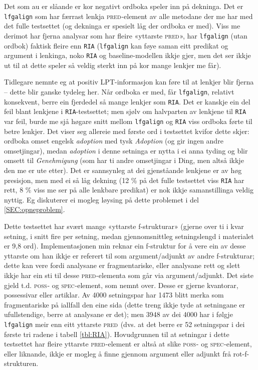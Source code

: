 \documentclass[12pt,a4paper,oneside,draft]{report}
\newcommand{\F}[2]{\textsc{#1}\ensuremath{_{#2}}}
\newcommand{\SPEC}{\F{spec}{}}
\newcommand{\POSS}{\F{poss}{}}
\newcommand{\PRED}{\F{pred}{}}
\begin{document}
Det som au er slåande er kor negativt ordboka speler inn på dekninga.
 Det er \texttt{lfgalign} som har færrast lenkja \PRED{}-element av alle
 metodane der me har med det fulle testsettet (og dekninga er spesielt
 låg der ordboka er med). Viss me derimot har fjerna analysar som har
 fleire «yttarste \PRED{}», har \texttt{lfgalign} (utan ordbok) faktisk
 fleire enn \texttt{RIA} (\texttt{lfgalign} kan føye saman eitt predikat og argument
 i lenkinga, noko \texttt{RIA} og baseline-modellen ikkje gjer, men det ser
 ikkje ut til at dette speler så veldig sterkt inn på kor mange
 lenkjer me får).

Tidlegare nemnte eg at positiv LPT\hyp{}informasjon kan føre til at lenkjer
 blir fjerna -- dette blir ganske tydeleg her. Når ordboka er med, får
 \texttt{lfgalign}, relativt konsekvent, berre ein fjerdedel så mange lenkjer
 som \texttt{RIA}.  Det er kanskje ein del feil blant lenkjene i
 \texttt{RIA}-testsettet; men sjølv om halvparten av lenkjene til \texttt{RIA} var
 feil, burde me sjå høgare snitt mellom \texttt{lfgalign} og \texttt{RIA} viss
 ordboka førte til betre lenkjer. Det viser seg allereie med første
 ord i testsettet kvifor dette skjer: ordboka omset engelsk \emph{adoption}
 med tysk \emph{Adoption} (og gir ingen andre omsetjingar), medan
 \emph{adoption} i denne setninga er nytta i ei anna tyding og blir omsett
 til \emph{Genehmigung} (som har ti andre omsetjingar i Ding, men altså
 ikkje den me er ute etter).  Det er sannsynleg at dei gjenståande
 lenkjene er av høg presisjon, men med ei så låg dekning (12 \% på det
 fulle testsettet viss \texttt{RIA} har rett, 8 \% viss me ser på alle
 lenkbare predikat) er nok ikkje samanstillinga veldig nyttig. Eg
 diskuterer ei mogleg løysing på dette problemet i del
 \ref{SEC:opneproblem}.

Dette testsettet har svært mange «yttarste f\hyp{}strukturar» (gjerne over
 ti i kvar setning, i snitt fire per setning, medan gjennomsnittleg
 setningslengd i materialet er 9,8 ord). Implementasjonen min reknar
 ein f\hyp{}struktur for å vere ein av desse yttarste om han ikkje er
 referert til som argument/adjunkt av andre f\hyp{}strukturar; dette kan
 vere fordi analysane er fragmentariske, eller analysane rett og slett
 ikkje har ein sti til desse \PRED{}-elementa som går via
 argument/adjunkt. Det siste gjeld t.d.  \POSS{}- og \SPEC{}-element,
 som nemnt over. Desse er gjerne kvantorar, possessivar eller
 artiklar. Av 4000 setningspar har 1473 blitt merka som fragmentariske
 på iallfall den eine sida (dette treng ikkje tyde at setningane er
 ufullstendige, berre at analysane er det); men 3948 av dei 4000 har i følgje
 \texttt{lfgalign} meir enn eitt yttarste \PRED{} (dvs. at det berre er 52
 setningspar i dei første tri radene i tabell
 \ref{tbl:RIA}). Hovudgrunnen til at setningar i dette testsettet har
 fleire yttarste \PRED{}-element er altså at slike \POSS{}- og
 \SPEC{}-element, eller liknande, ikkje er mogleg å finne gjennom
 argument eller adjunkt frå rot-f\hyp{}strukturen.
\end{document}
